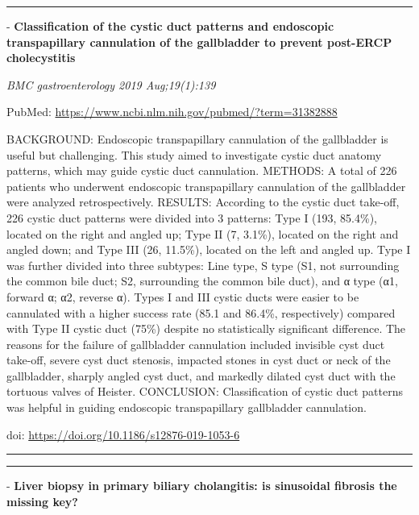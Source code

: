 \documentclass[]{article}
\begin{document}
\begin{center}\rule{0.5\linewidth}{\linethickness}\end{center}

 - \textbf{Classification of the cystic duct patterns and endoscopic
transpapillary cannulation of the gallbladder to prevent post-ERCP
cholecystitis}

\emph{BMC gastroenterology 2019 Aug;19(1):139}

PubMed: \url{https://www.ncbi.nlm.nih.gov/pubmed/?term=31382888}

BACKGROUND: Endoscopic transpapillary cannulation of the gallbladder is
useful but challenging. This study aimed to investigate cystic duct
anatomy patterns, which may guide cystic duct cannulation. METHODS: A
total of 226 patients who underwent endoscopic transpapillary
cannulation of the gallbladder were analyzed retrospectively. RESULTS:
According to the cystic duct take-off, 226 cystic duct patterns were
divided into 3 patterns: Type I (193, 85.4\%), located on the right and
angled up; Type II (7, 3.1\%), located on the right and angled down; and
Type III (26, 11.5\%), located on the left and angled up. Type I was
further divided into three subtypes: Line type, S type (S1, not
surrounding the common bile duct; S2, surrounding the common bile duct),
and α type (α1, forward α; α2, reverse α). Types I and III cystic ducts
were easier to be cannulated with a higher success rate (85.1 and
86.4\%, respectively) compared with Type II cystic duct (75\%) despite
no statistically significant difference. The reasons for the failure of
gallbladder cannulation included invisible cyst duct take-off, severe
cyst duct stenosis, impacted stones in cyst duct or neck of the
gallbladder, sharply angled cyst duct, and markedly dilated cyst duct
with the tortuous valves of Heister. CONCLUSION: Classification of
cystic duct patterns was helpful in guiding endoscopic transpapillary
gallbladder cannulation.

doi: \url{https://doi.org/10.1186/s12876-019-1053-6}

{}

{}

\begin{center}\rule{0.5\linewidth}{\linethickness}\end{center}

\begin{center}\rule{0.5\linewidth}{\linethickness}\end{center}

 - \textbf{Liver biopsy in primary biliary cholangitis: is sinusoidal
fibrosis the missing key?}
\end{document}
